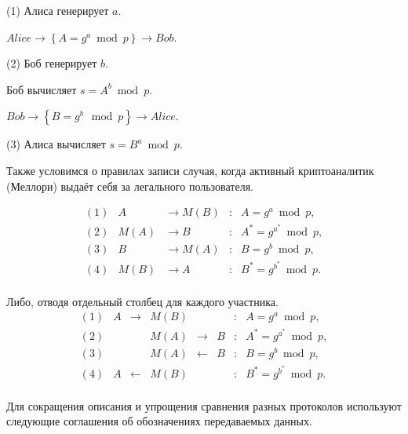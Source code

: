 \begin{protocol}
	\item[(1)] Алиса генерирует $a$.
	\item[] $Alice \to \left\{ A = g^a \bmod p \right\} \to Bob$.
	\item[(2)] Боб генерирует $b$.
	\item[] Боб вычисляет $s = A^b \bmod p$.
	\item[] $Bob \to \left\{ B = g^b \mod p \right\} \to Alice$.
	\item[(3)] Алиса вычисляет $s = B^a \bmod p$.
\end{protocol}

Также условимся о правилах записи случая, когда активный криптоаналитик (Меллори) выдаёт себя за легального пользователя.

\[
\begin{array}{llllc}
(1) & A                & \to M \left(B\right) & : & A   = g^a     \bmod p, \\ 
(2) & M \left(A\right) & \to B                & : & A^* = g^{a^*} \bmod p, \\ 
(3) & B                & \to M \left(A\right) & : & B   = g^b     \bmod p, \\ 
(4) & M \left(B\right) & \to A                & : & B^* = g^{b^*} \bmod p. \\
\end{array}
\]

Либо, отводя отдельный столбец для каждого участника.
\[
\begin{array}{lllclllc}
	(1) & A  & \to   & M \left(B\right) & {}    & {} & : & A = g^a     \bmod p, \\ 
	(2) & {} & {}    & M \left(A\right) & \to   & B  & : & A^* = g^{a^*} \bmod p, \\ 
	(3) & {} & {}    & M \left(A\right) & \gets & B  & : & B   = g^b     \bmod p, \\ 
	(4) & A  & \gets & M \left(B\right) & {}    & {} & : & B^* = g^{b^*} \bmod p. \\
\end{array}
\]

Для сокращения описания и упрощения сравнения разных протоколов используют следующие соглашения об обозначениях передаваемых данных.

